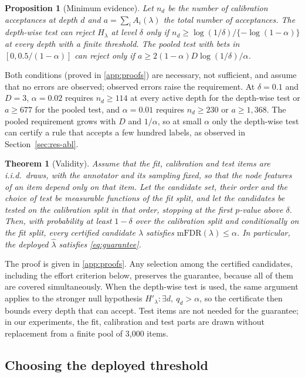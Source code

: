 \documentclass[preprint,12pt]{elsarticle}
\newtheorem{theorem}{Theorem}
\newtheorem{proposition}{Proposition}
\theoremstyle{definition}
\newcommand{\fdr}{\mathrm{mFDR}}
\begin{document}
\begin{proposition}[Minimum evidence]
\label{prop:evidence}
Let $n_d$ be the number of calibration acceptances at depth $d$ and
$a=\sum_i A_i(\lambda)$ the total number of acceptances. The depth-wise test
can reject $H_\lambda$ at level $\delta$ only if
$n_d\ge\log(1/\delta)/\{-\log(1-\alpha)\}$ at every depth with a finite
threshold. The pooled test with bets in $[0,0.5/(1-\alpha)]$ can reject only if
$a\ge2(1-\alpha)D\log(1/\delta)/\alpha$.
\end{proposition}

Both conditions (proved in \ref{app:proofs}) are necessary, not sufficient,
and assume that no errors are observed; observed errors raise the requirement.
At
$\delta=0.1$ and $D=3$, $\alpha=0.02$ requires $n_d\ge114$ at every active
depth for the depth-wise test or $a\ge677$ for the pooled test, and
$\alpha=0.01$ requires $n_d\ge230$ or $a\ge1{,}368$. The pooled requirement
grows with $D$ and $1/\alpha$, so at small $\alpha$ only the depth-wise test can
certify a rule that accepts a few hundred labels, as observed in
Section~\ref{sec:res-abl}.

\begin{theorem}[Validity]
\label{thm:validity}
Assume that the fit, calibration and test items are i.i.d.\ draws, with the
annotator and its sampling fixed, so that the node features of an item depend
only on that item. Let the candidate
set, their order and the choice of test be measurable functions of the fit
split, and let the candidates be tested on the calibration split in that order,
stopping at the first $p$-value above $\delta$. Then, with probability at least
$1-\delta$ over the calibration split and conditionally on the fit split, every
certified candidate $\lambda$ satisfies $\fdr(\lambda)\le\alpha$. In particular,
the deployed $\hat\lambda$ satisfies \eqref{eq:guarantee}.
\end{theorem}

The proof is given in \ref{app:proofs}. Any selection among the certified
candidates, including the effort criterion below, preserves the guarantee,
because all of them are covered simultaneously. When the depth-wise test is used, the same argument applies to
the stronger null hypothesis $H'_\lambda:\exists d,\ q_d>\alpha$, so the
certificate then bounds every depth that can accept. Test items are not needed
for the guarantee; in our experiments, the fit, calibration and test parts are
drawn without replacement from a finite pool of 3,000 items.

\subsection{Choosing the deployed threshold}
\label{sec:method-select}
\end{document}
